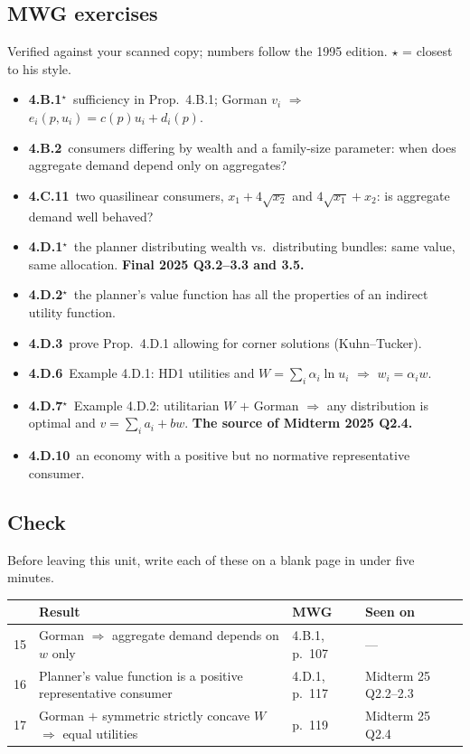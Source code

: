 \documentclass[11pt]{article}
\begin{document}
\subsection{MWG exercises}
\begin{todo}{Verified against your scanned copy; numbers follow the 1995 edition. $\star$ = closest to his style.}
\begin{itemize}
\item \textbf{4.B.1}$^\star$\ sufficiency in Prop.~4.B.1; Gorman $v_i$ $\Rightarrow$ $e_i(p,u_i)=c(p)u_i+d_i(p)$.
\item \textbf{4.B.2}\ consumers differing by wealth and a family-size parameter: when does aggregate demand depend only on aggregates?
\item \textbf{4.C.11}\ two quasilinear consumers, $x_1+4\sqrt{x_2}$ and $4\sqrt{x_1}+x_2$: is aggregate demand well behaved?
\item \textbf{4.D.1}$^\star$\ the planner distributing wealth vs.\ distributing bundles: same value, same allocation. \textbf{Final 2025 Q3.2--3.3 and 3.5.}
\item \textbf{4.D.2}$^\star$\ the planner's value function has all the properties of an indirect utility function.
\item \textbf{4.D.3}\ prove Prop.~4.D.1 allowing for corner solutions (Kuhn--Tucker).
\item \textbf{4.D.6}\ Example 4.D.1: HD1 utilities and $W=\sum_i\alpha_i\ln u_i$ $\Rightarrow$ $w_i=\alpha_iw$.
\item \textbf{4.D.7}$^\star$\ Example 4.D.2: utilitarian $W$ $+$ Gorman $\Rightarrow$ any distribution is optimal and $v=\sum_ia_i+bw$. \textbf{The source of Midterm 2025 Q2.4.}
\item \textbf{4.D.10}\ an economy with a positive but no normative representative consumer.
\end{itemize}
\end{todo}
\subsection{Check}
Before leaving this unit, write each of these on a blank page in under five minutes.
\begin{center}\small\begin{tabular}{rp{7.4cm}p{3.3cm}p{3.1cm}}\toprule & Result & MWG & Seen on\\\midrule
15 & Gorman $\Rightarrow$ aggregate demand depends on $w$ only & 4.B.1, p.~107 & ---\\
16 & Planner's value function is a positive representative consumer & 4.D.1, p.~117 & Midterm 25 Q2.2--2.3\\
17 & Gorman $+$ symmetric strictly concave $W$ $\Rightarrow$ equal utilities & p.~119 & Midterm 25 Q2.4\\
\bottomrule\end{tabular}\end{center}
\end{document}
